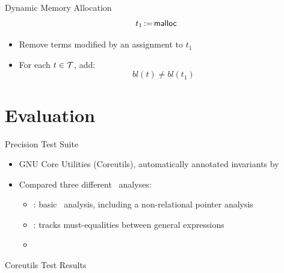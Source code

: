 \documentclass[aspectratio=169]{beamer}
\begin{document}
\begin{frame}{Dynamic Memory Allocation}
    \[
        t_1\,{:=}\,\textsf{malloc}
    \]
    \begin{itemize}
        \pause
        \item Remove terms modified by an assignment to $t_1$
              \pause
        \item For each $t \in \mathcal{T}$, add:
              \[
                  bl(t) \neq bl(t_1)
              \]
    \end{itemize}
\end{frame}

\section{Evaluation}

\begin{frame}{Precision Test Suite}
    \begin{itemize}
        \item GNU Core Utilities (Coreutils), automatically annotated invariants by \cpo\
              \pause
        \item Compared three different \goblint\ analyses:
              \begin{itemize}
                  \item \base{}: basic \goblint\ analysis, including a non-relational pointer analysis
                  \item \vareq{}: tracks must-equalities between general expressions
                  \item \cpo\
              \end{itemize}
    \end{itemize}
\end{frame}

\begin{frame}{Coreutils Test Results}
    \centering


\end{frame}
\end{document}
